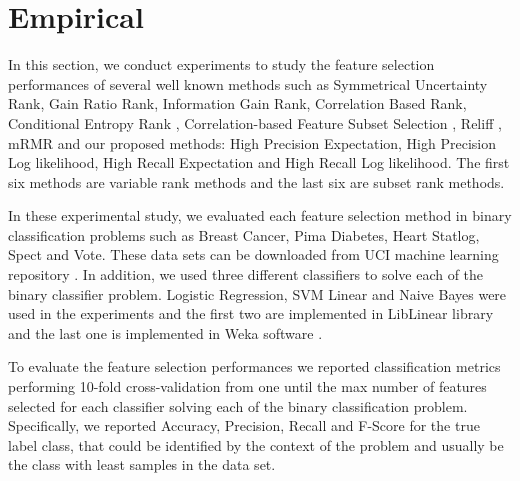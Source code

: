 \section{Empirical}
In this section, we conduct experiments to study the feature selection performances of several well known methods such as Symmetrical Uncertainty Rank, Gain Ratio Rank, Information Gain Rank, Correlation Based Rank, Conditional Entropy Rank \cite{guyon_jmlr03}, Correlation-based Feature Subset Selection \cite{Hall1998},  Reliff \cite{Robnik-Sikonja2003} , mRMR \cite{peng2005} and our proposed methods: High Precision Expectation, High Precision Log likelihood, High Recall Expectation and High Recall Log likelihood. The first six methods are variable rank methods and the last six are subset rank methods. 

In these experimental study, we evaluated each feature selection method in binary classification problems such as Breast Cancer, Pima Diabetes, Heart Statlog, Spect and Vote. These data sets can be downloaded from UCI machine learning repository \cite{Bache+Lichman:2013}. In addition, we used three different classifiers to solve each of the binary classifier problem. Logistic Regression, SVM Linear and Naive Bayes were used in the experiments and the first two are implemented in LibLinear library \cite{REF08a} and the last one is implemented in Weka software \cite{weka}.
 
To evaluate the feature selection performances we reported classification metrics performing 10-fold cross-validation from one until the max number of features selected for each classifier solving each of the binary classification problem. Specifically, we reported Accuracy, Precision, Recall and F-Score for the true label class, that could be identified by the context of the problem and usually be the class with least samples in the data set.